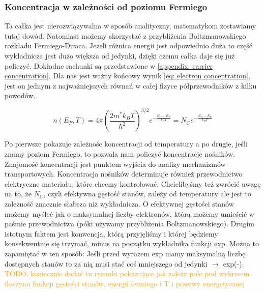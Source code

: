         \subsubsection{Koncentracja w zależności od poziomu Fermiego}
            Ta całka jest nierozwiązywalna w sposób analityczny, matematykom zostawiamy tutaj dowód. Natomiast możemy skorzystać z przybliżenia Boltzmanowskiego
            rozkładu Fermiego-Diraca. Jeżeli różnica energii jest odpowiednio duża to część wykładnicza jest dużo większa od jedynki, dzięki czemu całka daje się już policzyć.
            Dokładne rachunki są przedstawione w \ref{appendix: carrier concentration}. Dla nas jest ważny końcowy wynik \ref{eq: electron concentration}, jest on jednym z najważniejszych równań w 
            całej fizyce półprzewodników z kilku powodów.
            \begin{tcolorbox}[colback=black!15!white, colframe=gray!25!black, title=koncentracja elektronów]
                \begin{equation}
                    n(E_F,T) = 4\pi \left( \frac{2m^*k_BT}{\hbar^2}\right)^{3/2}e^{-\frac{E_C - E_F}{k_BT}} = N_Ce^{-\frac{E_C - E_F}{k_BT}}
                    \label{eq: electron concentration}
                \end{equation}
            \end{tcolorbox}
            \noindent Po pierwsze pokazuje zależnośc koncentracji od temperatury a po drugie, jeśli znamy poziom Fermiego, to pozwala nam policzyć koncentracje nośników.
            Znajomość koncentracji jest punktem wyjścia do analizy mechanizmów transportowych. Koncentracja nośników determinuje również przewodnictwo elektryczne materiału, które chcemy kontrolować. 
            Chcielibyśmy też zwrócić uwagę na to, że $N_C$, czyli efektywna gęstość stanów, zależy od temperatury ale jest to zależność znacznie słabsza niż wykładnicza. 
            O efektywnej gęstości stanów możemy myśleć jak o maksymalnej liczby elektronów, którą możemy umieścić w paśmie przewodnictwa (póki używamy przybliżenia Boltzmanowskiego). 
            Drugim istotnym faktem jest konwencja, którą przyjęliśmy i której będziemy konsekwentnie się trzymać, minus na początku wykładnika funkcji exp. Można to zapamiętać w ten sposób:
            Jeśli przed wyrazem exp mamy maksymalną liczbę dostępnych stanów to za nią musi stać coś mniejszego od jedynki $\rightarrow$ exp(-).  
            \newline\newline
            \noindent\textcolor{orange}{TODO: koniecznie dodać tu rysunki pokazujące jak zależy pole pod wykresem iloczynu funkcji gęstości stanów, energii fermiego i T i przerwy energetycznej}

